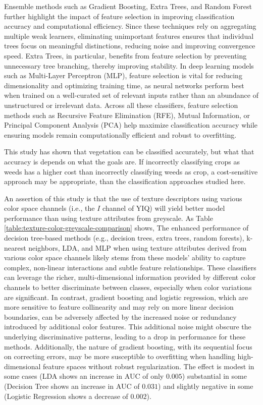 \documentclass[letterpaper]{report}
\begin{document}
Ensemble methods such as Gradient Boosting, Extra Trees, and Random Forest further highlight the impact of feature selection in improving classification accuracy and computational efficiency. Since these techniques rely on aggregating multiple weak learners, eliminating unimportant features ensures that individual trees focus on meaningful distinctions, reducing noise and improving convergence speed. Extra Trees, in particular, benefits from feature selection by preventing unnecessary tree branching, thereby improving stability. In deep learning models such as Multi-Layer Perceptron (MLP), feature selection is vital for reducing dimensionality and optimizing training time, as neural networks perform best when trained on a well-curated set of relevant inputs rather than an abundance of unstructured or irrelevant data. Across all these classifiers, feature selection methods such as Recursive Feature Elimination (RFE), Mutual Information, or Principal Component Analysis (PCA) help maximize classification accuracy while ensuring models remain computationally efficient and robust to overfitting.

This study has shown that vegetation can be classified accurately, but what that accuracy is depends on what the goals are. If incorrectly classifying crops as weeds has a higher cost than incorrectly classifying weeds as crop, a cost-sensitive approach may be appropriate, than the classification approaches studied here. 

An assertion of this study is that the use of texture descriptors using various color space channels (i.e., the $I$ channel of YIQ) will yield better model performance than using texture attributes from greyscale.  As Table \ref{table:texture-color-greyscale-comparison} shows, The enhanced performance of decision tree-based methods (e.g., decision trees, extra trees, random forests), k-nearest neighbors, LDA, and MLP when using texture attributes derived from various color space channels likely stems from these models’ ability to capture complex, non-linear interactions and subtle feature relationships. These classifiers can leverage the richer, multi-dimensional information provided by different color channels to better discriminate between classes, especially when color variations are significant. In contrast, gradient boosting and logistic regression, which are more sensitive to feature collinearity and may rely on more linear decision boundaries, can be adversely affected by the increased noise or redundancy introduced by additional color features. This additional noise might obscure the underlying discriminative patterns, leading to a drop in performance for these methods. Additionally, the nature of gradient boosting, with its sequential focus on correcting errors, may be more susceptible to overfitting when handling high-dimensional feature spaces without robust regularization. The effect is modest in some cases (LDA shows an increase in AUC of only $0.005$) substantial in some (Decision Tree shows an increase in AUC of $0.031$) and slightly negative in some (Logistic Regression shows a decrease of $0.002$).
\end{document}
